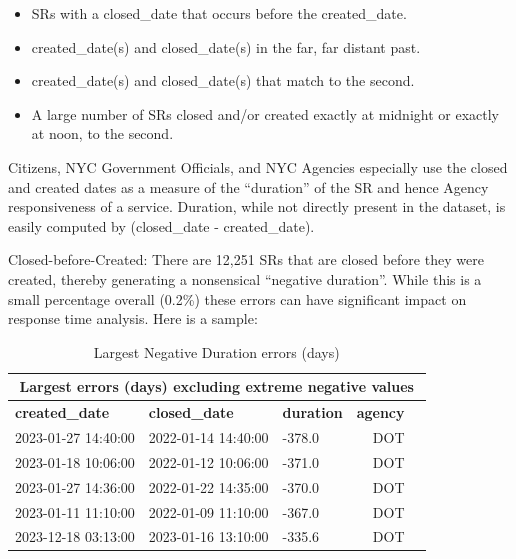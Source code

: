 \documentclass[12pt, titlepage]{article}
\begin{document}
	
\begin{itemize}
	\item SRs with a closed\_date that occurs before the created\_date.

 	\item created\_date(s) and closed\_date(s) in the far, far distant past.

 	\item created\_date(s) and closed\_date(s) that match to the second.

	\item A large number of SRs closed and/or created exactly at midnight 
	or exactly at noon, to the second.
\end{itemize}
	
	
Citizens, NYC Government Officials, and NYC Agencies especially use 
the closed and created dates as a measure of the ``duration'' of the SR 
and hence Agency responsiveness of a service. Duration, while 
not directly present in the dataset, is easily 
computed by (closed\_date - created\_date).
	
Closed-before-Created: There are 12,251 SRs that are closed before they 
were created, thereby generating a nonsensical ``negative duration''. 
While this is a small percentage overall (0.2\%) these errors can 
have significant impact on response time analysis. Here is a sample:


\begin{table}[tbp]
    \centering
    \caption{Largest Negative Duration errors (days)}
	    \begin{tabular}{l l l r l}
	        \toprule
	        \multicolumn{5}{c}{\textbf{Largest errors (days) excluding 
	        extreme negative values}} \\
	        \midrule
	        \textbf{created\_date} & \textbf{closed\_date} & \textbf{duration} 
	        & \textbf{agency} \\
		        \midrule
		        2023-01-27 14:40:00 & 2022-01-14 14:40:00 & -378.0 & DOT \\
		        2023-01-18 10:06:00 & 2022-01-12 10:06:00 & -371.0 & DOT \\
		        2023-01-27 14:36:00 & 2022-01-22 14:35:00 & -370.0 & DOT \\
		        2023-01-11 11:10:00 & 2022-01-09 11:10:00 & -367.0 & DOT \\
		        2023-12-18 03:13:00 & 2023-01-16 13:10:00 & -335.6 & DOT \\
		        \bottomrule
	    \end{tabular}
    \label{tab:largest-errors}
\end{table}
\end{document}
